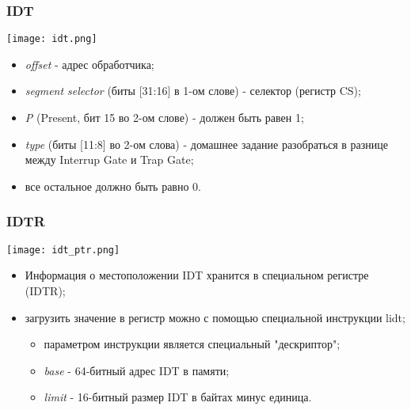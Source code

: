 \begin{frame}
\frametitle{IDT}
\begin{center}
  \texttt{[image: idt.png]}
\end{center}
\begin{itemize}
  \item \emph{offset} - адрес обработчика;
  \item \emph{segment selector} (биты [31:16] в 1-ом слове) - селектор (регистр
  CS);
  \item \emph{P} (Present, бит 15 во 2-ом слове) - должен быть равен 1;
  \item \emph{type} (биты [11:8] во 2-ом слова) - домашнее задание разобраться
  в разнице между Interrup Gate и Trap Gate;
  \item все остальное должно быть равно 0.
\end{itemize}
\end{frame}

\begin{frame}
\frametitle{IDTR}
\begin{center}
  \texttt{[image: idt\_ptr.png]}
\end{center}
\begin{itemize}
  \item Информация о местоположении IDT хранится в специальном регистре (IDTR);
  \item загрузить значение в регистр можно с помощью специальной инструкции
  lidt;
  \begin{itemize}
    \item параметром инструкции является специальный "дескриптор";
    \item \emph{base} - 64-битный адрес IDT в памяти;
    \item \emph{limit} - 16-битный размер IDT в байтах минус единица.
  \end{itemize}
\end{itemize}
\end{frame}

